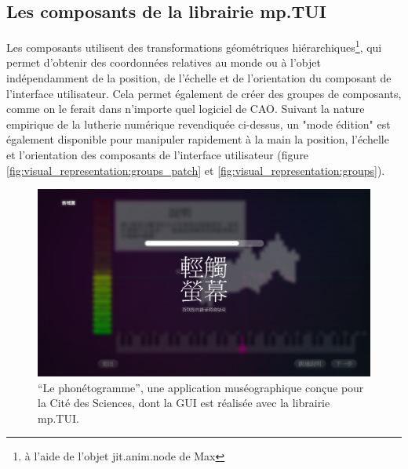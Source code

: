 \subsection{Les composants de la librairie mp.TUI}

\noindent Les composants utilisent des transformations géométriques hiérarchiques\footnote{à l'aide de l'objet jit.anim.node de Max}, qui permet d'obtenir des coordonnées relatives au monde ou à l'objet indépendamment de la position, de l'échelle et de l'orientation du composant de l'interface utilisateur. Cela permet également de créer des groupes de composants, comme on le ferait dans n'importe quel logiciel de CAO. Suivant la nature empirique de la lutherie numérique revendiquée ci-dessus, un "mode édition" est également disponible pour manipuler rapidement à la main la position, l'échelle et l'orientation des composants de l'interface utilisateur (figure \ref{fig:visual_representation:groups_patch} et \ref{fig:visual_representation:groups}).

\begin{figure}[!htbp]
	\captionsetup{format=plain}%
	\includegraphics[width=\textwidth]{gfx/06_visual_representation/Phonetogramme.png}
	\caption[``Le phonétogramme'', une application réalisée à l'aide de la librairie mp.TUI]{``Le phonétogramme'', une application muséographique conçue pour la Cité des Sciences, dont la GUI est réalisée avec la librairie mp.TUI.}
	\label{fig:visual_representation:phonetogramme}
\end{figure}

